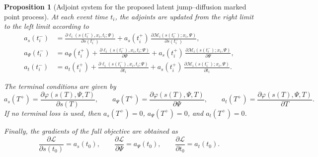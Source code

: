 \documentclass[11pt]{article}
\newtheorem{proposition}{Proposition}
\theoremstyle{definition}
\numberwithin{equation}{section}
\numberwithin{theorem}{section}
\numberwithin{proposition}{section}
\numberwithin{lemma}{section}
\numberwithin{corollary}{section}
\numberwithin{definition}{section}
\numberwithin{remark}{section}
\newcommand{\1}{\mathbbm{1}}
\begin{document}
\begin{proposition}[Adjoint system for the proposed latent jump--diffusion marked point process]
At each event time $t_i$, the adjoints are updated from the right limit to the left limit according to
\begin{align}
\label{eq:adjoint_state_jump}
a_s(t_i^-)
&=
\frac{\partial \ell_i(s(t_i^-),x_i,t_i;\Psi)}{\partial s(t_i^-)}
+
a_s(t_i^+)\,
\frac{\partial \mathcal M_i(s(t_i^-);x_i,\Psi)}{\partial s(t_i^-)},\\
\label{eq:adjoint_param_jump}
a_\Psi(t_i^-)
&=
a_\Psi(t_i^+)
+
\frac{\partial \ell_i(s(t_i^-),x_i,t_i;\Psi)}{\partial \Psi}
+
a_s(t_i^+)\,
\frac{\partial \mathcal M_i(s(t_i^-);x_i,\Psi)}{\partial \Psi},\\
\label{eq:adjoint_time_jump}
a_t(t_i^-)
&=
a_t(t_i^+)
+
\frac{\partial \ell_i(s(t_i^-),x_i,t_i;\Psi)}{\partial t_i}
+
a_s(t_i^+)\,
\frac{\partial \mathcal M_i(s(t_i^-);x_i,\Psi)}{\partial t_i}.
\end{align}

The terminal conditions are given by
\begin{equation}
\label{eq:adjoint_terminal}
a_s(T^+)=\frac{\partial \varphi(s(T),\Psi,T)}{\partial s(T)},
\qquad
a_\Psi(T^+)=\frac{\partial \varphi(s(T),\Psi,T)}{\partial \Psi},
\qquad
a_t(T^+)=\frac{\partial \varphi(s(T),\Psi,T)}{\partial T}.
\end{equation}
If no terminal loss is used, then $a_s(T^+)=0$, $a_\Psi(T^+)=0$, and $a_t(T^+)=0$.

Finally, the gradients of the full objective are obtained as
\begin{equation}
\label{eq:adjoint_gradients}
\frac{\partial \mathcal L}{\partial s(t_0)}=a_s(t_0),
\qquad
\frac{\partial \mathcal L}{\partial \Psi}=a_\Psi(t_0),
\qquad
\frac{\partial \mathcal L}{\partial t_0}=a_t(t_0).
\end{equation}
\end{proposition}
\end{document}
